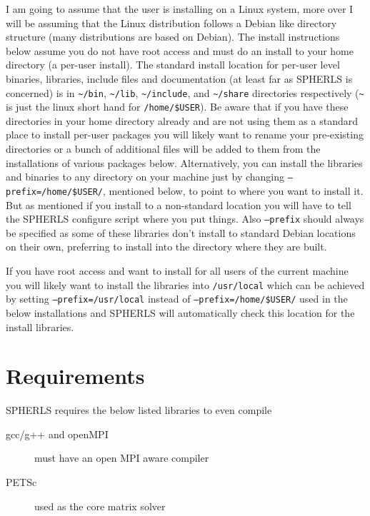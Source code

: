 \documentclass[12pt,a4paper]{book}
\begin{document}
I am going to assume that the user is installing on a Linux system, more over I will be assuming that the Linux distribution follows a Debian like directory structure (many distributions are based on Debian). The install instructions below assume you do not have root access and must do an install to your home directory (a per-user install). The standard install location for per-user level binaries, libraries, include files and documentation (at least far as SPHERLS is concerned) is in {\tt \textasciitilde/bin}, {\tt \textasciitilde/lib}, {\tt \textasciitilde/include}, and {\tt \textasciitilde/share} directories respectively ({\tt \textasciitilde} is just the linux short hand for {\tt /home/\-\$USER}). Be aware that if you have these directories in your home directory already and are not using them as a standard place to install per-user packages you will likely want to rename your pre-existing directories or a bunch of additional files will be added to them from the installations of various packages below. Alternatively, you can install the libraries and binaries to any directory on your machine just by changing {\tt --prefix\-=/home/\-\$USER/}, mentioned below, to point to where you want to install it. But as mentioned if you install to a non-standard location you will have to tell the SPHERLS configure script where you put things. Also {\tt --prefix} should always be specified as some of these libraries don't install to standard Debian locations on their own, preferring to install into the directory where they are built.

If you have root access and want to install for all users of the current machine you will likely want to install the libraries into {\tt /usr/\-local}  which can be achieved by setting {\tt --prefix=/usr/local} instead of {\tt --prefix\-=/home/\-\$USER/} used in the below installations and SPHERLS will automatically check this location for the install libraries.
    
\section{Requirements}
SPHERLS requires the below listed libraries to even compile
\begin{description}
\item[gcc/g++ and openMPI] must have an open MPI aware compiler
\item[PETSc] used as the core matrix solver
\end{description}
\end{document}
